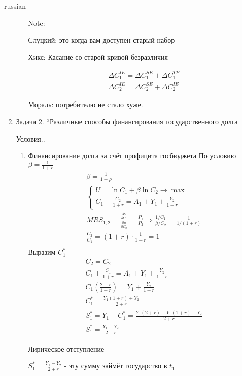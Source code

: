 \documentclass{article}
\begin{document}
\begin{otherlanguage*}{russian}
\begin{enumerate}
\begin{enumerate}
Note: 

Слуцкий: это когда вам доступен старый набор

Хикс: Касание со старой кривой безразличия   


\begin{align} 
\Delta C_1^{IE} = \Delta C_1^{SE} + \Delta C_1^{TE} \\
\Delta C_2^{IE} = \Delta C_2^{SE} + \Delta C_2^{IE} 
\end{align} 

Мораль: потребителю не стало хуже. 
\end{enumerate}

\item Задача 2. “Различные способы финансирования государственного долга

Условия..
\begin{enumerate}
\item  Финансирование долга за счёт профицита госбюджета
По условию $ \beta = \frac{1}{1 + r}$  
\begin{align}
\beta = \frac{1}{1 + \rho} \\
\begin{cases}
U = \ln C_1 + \beta \ln C_2 \rightarrow \max \\
C_1 + \frac{C_2}{1 + r} = A_1 + Y_1 + \frac{Y_2}{1 + r}
\end{cases} \\
MRS_{1,2} = \frac{\frac{\partial U}{\partial C_1}}{\frac{\partial u}{\partial C_2}} = \frac{P_1}{P_2} \Rightarrow \frac{1 / C_1}{\beta / C_2} = \frac{1}{1 / (1 + r)} \\
\frac{C_2}{C_1} = (1 + r) \cdot \frac{1}{1 + r} = 1 \\ 
\end{align}
Выразим $C_1^*$
\begin{align}
C_2 = C_2 \\ 
C_1 + \frac{C_1}{1 + r} = A_1 + Y_1 + \frac{Y_2}{1 + r } \\
C_1 (\frac{2 + r }{1 + r} ) = Y_1 + \frac{Y_2}{1 + r} \\
C_1^* = \frac{Y_1 (1 + r) + Y_2}{2 + r} \\
S_1^* = Y_1 - C_1^* = \frac{Y_1 (2 + r) - Y_1 ( 1 + r) - Y_2}{2 + r} \\
S_1^* = \frac{Y_1 - Y_2}{2 + r }
\end{align}

Лирическое отступление 

$ S_1^* = \frac{Y_1 - Y_2}{2 + r }$ - эту сумму займёт государство в $t_1$ 


\end{enumerate}
\end{enumerate}
\end{otherlanguage*}
\end{document}

